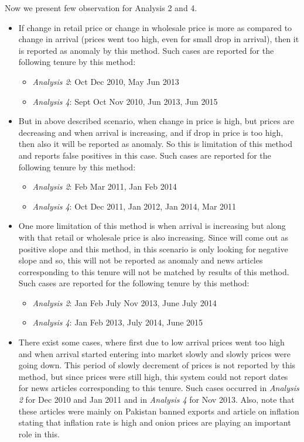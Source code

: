 \documentclass[a4paper,10pt]{report}
\begin{document}
		
		Now we present few observation for Analysis 2 and 4.
		
		\begin{itemize}
			\item If change in retail price or change in wholesale price is more as compared to change in arrival (prices went too high, even for small drop in arrival), then it is reported as anomaly by this method.
			Such cases are reported for the following tenure by this method:
			\begin{itemize}
				\item \textit{Analysis 2}: Oct Dec 2010, May Jun 2013
				\item \textit{Analysis 4}: Sept Oct Nov 2010, Jun 2013, Jun 2015
			\end{itemize}	
			
			\item But in above described scenario, when change in price is high, but prices are decreasing and when arrival is increasing, and if drop in price is too high, then also it will be reported as anomaly.	So this is limitation of this method and reports false positives in this case.
			Such cases are reported for the following tenure by this method:
			\begin{itemize}
				\item \textit{Analysis 2}: Feb Mar 2011, Jan Feb 2014
				\item \textit{Analysis 4}: Oct Dec 2011, Jan 2012, Jan 2014, Mar 2011
			\end{itemize}
			
			\item One more limitation of this method is when arrival is increasing but along with that retail or wholesale price is also increasing. Since will come out as positive slope and this method, in this scenario is only looking for negative slope and so, this will not be reported as anomaly and news articles corresponding to this tenure will not be matched by results of this method.
			Such cases are reported for the following tenure by this method:
			\begin{itemize}
				\item \textit{Analysis 2}: Jan Feb July Nov 2013, June July 2014
				\item \textit{Analysis 4}: Jan Feb 2013, July 2014, June 2015
			\end{itemize}
			
			\item There exist some cases, where first due to low arrival prices went too high and when arrival started entering into market slowly and slowly prices were going down. This period of slowly decrement of prices is not reported by this method, but since prices were still high, this system could not report dates for news articles corresponding to this tenure. Such cases occurred in \textit{Analysis 2} for Dec 2010 and Jan 2011 and in \textit{Analysis 4} for Nov 2013. Also, note that these articles were mainly on Pakistan banned exports and article on inflation stating that inflation rate is high and onion prices are playing an important role in this.
			

\end{itemize}
\end{document}
